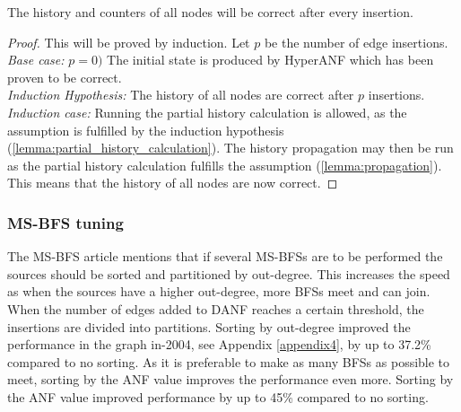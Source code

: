 \begin{theorem}
The history and counters of all nodes will be correct after every insertion.\\

\begin{proof} This will be proved by induction. Let $p$ be the number of edge insertions.\\

\noindent\textit{Base case:} $p = 0)$ The initial state is produced by HyperANF which has been proven to be correct.\\

\noindent\textit{Induction Hypothesis:} The history of all nodes are correct after $p$ insertions.\\

\iffalse
Given that the history of all nodes are correct after insertion $p$, they will be correct after insertion $p+1$.\\
\fi

\noindent\textit{Induction case:}
Running the partial history calculation is allowed, as the assumption is fulfilled by the induction hypothesis (\ref{lemma:partial_history_calculation}). The history propagation may then be run as the partial history calculation fulfills the assumption (\ref{lemma:propagation}). This means that the history of all nodes are now correct. 

\end{proof}
\end{theorem}

\subsubsection{MS-BFS tuning}
The MS-BFS article \cite{msbfs} mentions that if several MS-BFSs are to be performed the sources should be sorted and partitioned by out-degree. This increases the speed as when the sources have a higher out-degree, more BFSs meet and can join. When the number of edges added to DANF reaches a certain threshold, the insertions are divided into partitions. Sorting by out-degree improved the performance in the graph in-2004, see Appendix \ref{appendix4}, by up to 37.2\% compared to no sorting. As it is preferable to make as many BFSs as possible to meet, sorting by the ANF value improves the performance even more. Sorting by the ANF value improved performance by up to 45\% compared to no sorting.   


